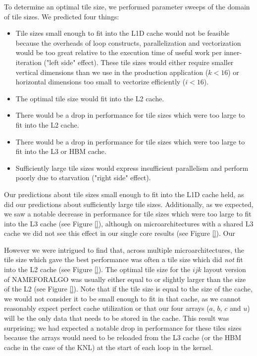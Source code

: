 \documentclass[conference]{IEEEtran}
\begin{document}
To determine an optimal tile size, we performed parameter sweeps of the domain
of tile sizes. We predicted four things:

\begin{itemize}
\item Tile sizes small enough to fit into the L1D cache would not be feasible
because the overheads of loop constructs, parallelization and vectorization
would be too great relative to the execution time of useful work per
inner-iteration ("left side" effect). These tile sizes would either require
smaller vertical dimensions than we use in the production application (\(k <
16\)) or horizontal dimensions too small to vectorize efficiently (\(i < 16\)).
\item The optimal tile size would fit into the L2 cache.
\item There would be a drop in performance for tile sizes which were too large to fit into the L2 cache.
\item There would be a drop in performance for tile sizes which were too large to fit into the L3 or HBM cache.
\item Sufficiently large tile sizes would express insufficient parallelism and
perform poorly due to starvation ("right side" effect).
\end{itemize}

Our predictions about tile sizes small enough to fit into the L1D cache held,
as did our predictions about sufficiently large tile sizes. Additionally, as we
expected, we saw a notable decrease in performance for tile sizes which were
too large to fit into the L3 cache (see Figure \ref{}), although on
microarchitectures with a shared L3 cache we did not see this effect in our
single core results (see Figure \ref{}). Our 

However we were intrigued to find that, across multiple microarchitectures, the
tile size which gave the best performance was often a tile size which did
\emph{not} fit into the L2 cache (see Figure \ref{}). The optimal tile size for
the \(ijk\) layout version of NAMEFORALGO was usually either equal to or
slightly larger than the size of the L2 (see Figure \ref{}). Note that if the
tile size is equal to the size of the cache, we would not consider it to be
small enough to fit in that cache, as we cannot reasonably expect perfect cache
utilization or that our four arrays (\(a\), \(b\), \(c\) and \(u\)) will be the
only data that needs to be stored in the cache. This result was surprising; we
had expected a notable drop in performance for these tiles sizes because the
arrays would need to be reloaded from the L3 cache (or the HBM cache in the
case of the KNL) at the start of each loop in the kernel. 
\end{document}
